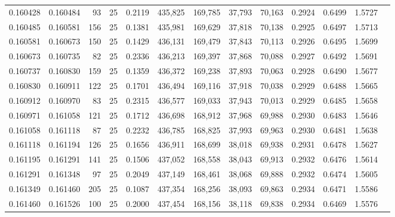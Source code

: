 \begin{tabular}{rrrrrrrrrrrrr}
0.160428 & 0.160484 &    93 &  25 &                                     0.2119 & 435,825 & 169,785 &  37,793 &  70,163 & 0.2924 & 0.6499 & 1.5727 \\
0.160485 & 0.160581 &   156 &  25 &                                     0.1381 & 435,981 & 169,629 &  37,818 &  70,138 & 0.2925 & 0.6497 & 1.5713 \\
0.160581 & 0.160673 &   150 &  25 &                                     0.1429 & 436,131 & 169,479 &  37,843 &  70,113 & 0.2926 & 0.6495 & 1.5699 \\
0.160673 & 0.160735 &    82 &  25 &                                     0.2336 & 436,213 & 169,397 &  37,868 &  70,088 & 0.2927 & 0.6492 & 1.5691 \\
0.160737 & 0.160830 &   159 &  25 &                                     0.1359 & 436,372 & 169,238 &  37,893 &  70,063 & 0.2928 & 0.6490 & 1.5677 \\
0.160830 & 0.160911 &   122 &  25 &                                     0.1701 & 436,494 & 169,116 &  37,918 &  70,038 & 0.2929 & 0.6488 & 1.5665 \\
0.160912 & 0.160970 &    83 &  25 &                                     0.2315 & 436,577 & 169,033 &  37,943 &  70,013 & 0.2929 & 0.6485 & 1.5658 \\
0.160971 & 0.161058 &   121 &  25 &                                     0.1712 & 436,698 & 168,912 &  37,968 &  69,988 & 0.2930 & 0.6483 & 1.5646 \\
0.161058 & 0.161118 &    87 &  25 &                                     0.2232 & 436,785 & 168,825 &  37,993 &  69,963 & 0.2930 & 0.6481 & 1.5638 \\
0.161118 & 0.161194 &   126 &  25 &                                     0.1656 & 436,911 & 168,699 &  38,018 &  69,938 & 0.2931 & 0.6478 & 1.5627 \\
0.161195 & 0.161291 &   141 &  25 &                                     0.1506 & 437,052 & 168,558 &  38,043 &  69,913 & 0.2932 & 0.6476 & 1.5614 \\
0.161291 & 0.161348 &    97 &  25 &                                     0.2049 & 437,149 & 168,461 &  38,068 &  69,888 & 0.2932 & 0.6474 & 1.5605 \\
0.161349 & 0.161460 &   205 &  25 &                                     0.1087 & 437,354 & 168,256 &  38,093 &  69,863 & 0.2934 & 0.6471 & 1.5586 \\
0.161460 & 0.161526 &   100 &  25 &                                     0.2000 & 437,454 & 168,156 &  38,118 &  69,838 & 0.2934 & 0.6469 & 1.5576 \\

\end{tabular}
